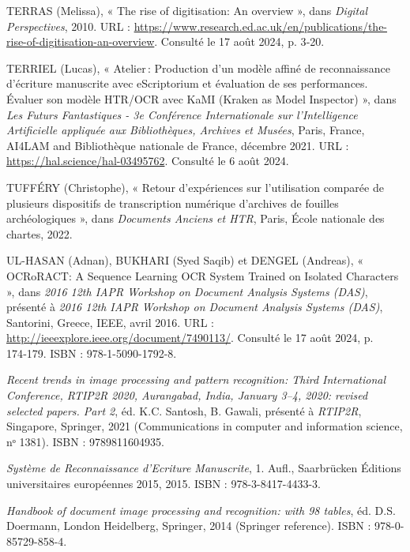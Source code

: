 \documentclass[a4paper,12pt,twoside]{book}
\begin{document}
\begin{thebibliography}{99}
		 \textsc{TERRAS} (Melissa), « The rise of digitisation: An overview », dans \emph{Digital Perspectives}, 2010. URL : \url{https://www.research.ed.ac.uk/en/publications/the-rise-of-digitisation-an-overview}. Consulté le 17 août 2024, p. 3‑20.
		
		 \textsc{TERRIEL} (Lucas), « Atelier : Production d’un modèle affiné de reconnaissance d’écriture manuscrite avec eScriptorium et évaluation de ses performances. Évaluer son modèle HTR/OCR avec KaMI (Kraken as Model Inspector) », dans \emph{Les Futurs Fantastiques - 3e Conférence Internationale sur l’Intelligence Artificielle appliquée aux Bibliothèques, Archives et Musées}, Paris, France, AI4LAM and Bibliothèque nationale de France, décembre 2021. URL : \url{https://hal.science/hal-03495762}. Consulté le 6 août 2024.
		
		 \textsc{TUFFÉRY} (Christophe), « Retour d’expériences sur l’utilisation comparée de plusieurs dispositifs de transcription numérique d’archives de fouilles archéologiques », dans \emph{Documents Anciens et HTR}, Paris, École nationale des chartes, 2022.
		
		 \textsc{UL-HASAN} (Adnan), \textsc{BUKHARI} (Syed Saqib) et \textsc{DENGEL} (Andreas), « OCRoRACT: A Sequence Learning OCR System Trained on Isolated Characters », dans \emph{2016 12th IAPR Workshop on Document Analysis Systems (DAS)}, présenté à \emph{2016 12th IAPR Workshop on Document Analysis Systems (DAS)}, Santorini, Greece, IEEE, avril 2016. URL : \url{http://ieeexplore.ieee.org/document/7490113/}. Consulté le 17 août 2024, p. 174‑179. ISBN : 978-1-5090-1792-8.
		
		 \emph{Recent trends in image processing and pattern recognition: Third International Conference, RTIP2R 2020, Aurangabad, India, January 3–4, 2020: revised selected papers. Part 2}, éd. K.C. Santosh, B. Gawali, présenté à \emph{RTIP2R}, Singapore, Springer, 2021 (Communications in computer and information science, nᵒ 1381). ISBN : 9789811604935.
		
		 \emph{Système de Reconnaissance d’Ecriture Manuscrite}, 1. Aufl., Saarbrücken Éditions universitaires européennes 2015, 2015. ISBN : 978-3-8417-4433-3.
		
		 \emph{Handbook of document image processing and recognition: with 98 tables}, éd. D.S. Doermann, London Heidelberg, Springer, 2014 (Springer reference). ISBN : 978-0-85729-858-4.
		

		
	\end{thebibliography}
	
\end{document}
